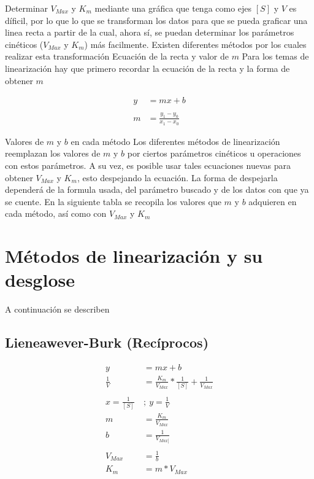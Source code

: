 Determinar $V_{Max}$ y $K_{m}$ mediante una gráfica que tenga como ejes $[S]$ y $V$ es díficil, por lo que lo que se transforman los datos para que se pueda graficar una linea recta a partir de la cual, ahora sí, se puedan determinar los parámetros cinéticos ($V_{Max}$ y $K_{m}$) más facilmente.
Existen diferentes métodos por los cuales realizar esta transformación
Ecuación de la recta y valor de $m$
Para los temas de linearización hay que primero recordar la ecuación de la recta y la forma de obtener $m$

\begin{align*}
    y &= mx+b
    \\
    \\
    m &= \frac{y_{1} - y_{0}}{x_{1} - x_{0}}
\end{align*}

Valores de $m$ y $b$ en cada método
Los diferentes métodos de linearización reemplazan los valores de $m$ y $b$ por ciertos parámetros cinéticos u operaciones con estos parámetros.
A su vez, es posible usar tales ecuaciones nuevas para obtener $V_{Max}$ y $K_{m}$, esto despejando la ecuación. La forma de despejarla dependerá de la formula usada, del parámetro buscado y de los datos con que ya se cuente.
En la siguiente tabla se recopila los valores que $m$ y $b$ adquieren en cada método, así como con $V_{Max}$ y $K_{m}$


\section{Métodos de linearización y su desglose}

A continuación se describen

\subsection{Lieneawever-Burk (Recíprocos)}

\begin{align*}
    y &= mx+b
    \\
    \frac{1}{V} &= \frac{K_{m}}{V_{Max}} * \frac{1}{[S]} + \frac{1}{V_{Max}}
    \\
    \\
    x = \frac{1}{[S]} \ &; \ y = \frac{1}{V}
    \\
    m &= \frac{K_{m}}{V_{Max}}
    \\
    b &= \frac{1}{V_{Max]}}
    \\
    \\
    V_{Max} &= \frac{1}{b}
    \\
    K_{m} &= m * V_{Max}
\end{align*}

